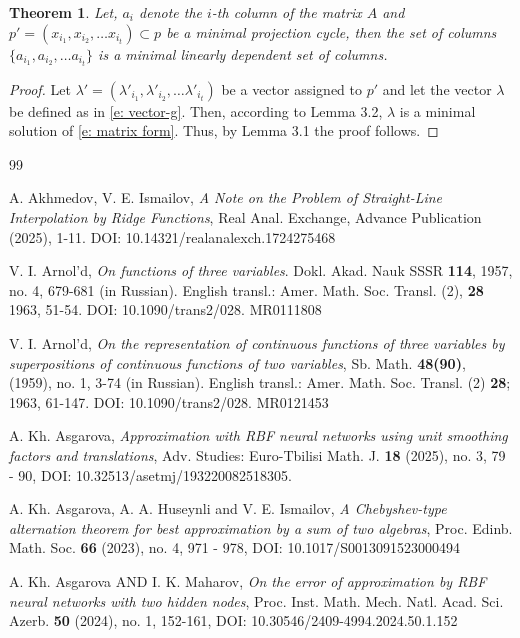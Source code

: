 \documentclass[12p]{article}
\numberwithin{equation}{section}
\newtheorem{theorem}{Theorem}[section]
\begin{document}
\begin{theorem}
    Let, \(a_i\) denote the \(i\)-th column of the matrix \(A\) and \(p'=(x_{i_1},x_{i_2},\dots x_{i_t}) \subset p\) be a minimal projection cycle, then the set of columns \(\{a_{i_1},a_{i_2},\dots a_{i_t}\}\) is a minimal linearly dependent set of columns.
\end{theorem}
\begin{proof}
    Let \(\lambda'=(\lambda'_{i_1},\lambda'_{i_2},\dots \lambda'_{i_t})\) be a vector assigned to \(p'\) and let the vector \(\lambda\) be defined as in \eqref{e: vector-g}. Then, according to Lemma 3.2, \(\lambda\) is a minimal solution of \eqref{e: matrix form}. Thus, by Lemma 3.1 the proof follows.
\end{proof}
\begin{thebibliography}{99}

A. Akhmedov, V. E. Ismailov, {\it A Note on the Problem of Straight-Line Interpolation by Ridge Functions}, Real Anal. Exchange, Advance Publication (2025), 1-11. DOI: 10.14321/realanalexch.1724275468

V. I. Arnol'd, {\it On functions of three variables}. Dokl. Akad. Nauk SSSR {\bf 114}, 1957, no. 4, 679-681 (in Russian). English transl.: Amer. Math. Soc. Transl. (2), {\bf 28} 1963, 51-54. DOI: 10.1090/trans2/028. MR0111808

V. I. Arnol'd, {\it On the representation of continuous functions of three variables by superpositions of continuous functions of two variables}, Sb. Math. {\bf 48(90)}, (1959), no. 1, 3-74 (in Russian). English transl.: Amer. Math. Soc. Transl. (2) {\bf 28}; 1963, 61-147. DOI: 10.1090/trans2/028. MR0121453

A. Kh. Asgarova, {\it Approximation with RBF neural networks using unit smoothing factors and translations}, Adv. Studies: Euro-Tbilisi Math. J. {\bf 18} (2025), no. 3,  79 - 90, DOI: 10.32513/asetmj/193220082518305.

A. Kh. Asgarova, A. A. Huseynli and V. E. Ismailov, {\it A Chebyshev-type alternation theorem for best approximation by a sum of two algebras}, Proc. Edinb. Math. Soc. {\bf 66} (2023), no. 4, 971 - 978, DOI: 10.1017/S0013091523000494

A. Kh. Asgarova AND I. K. Maharov, {\it On the error of approximation by RBF neural networks with two hidden nodes}, Proc. Inst. Math. Mech. Natl. Acad. Sci. Azerb. {\bf 50} (2024), no. 1, 152-161, DOI: 10.30546/2409-4994.2024.50.1.152


\end{thebibliography}
\end{document}
